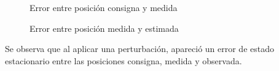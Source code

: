 \documentclass[a4paper, 10pt, onecolumn,journal]{ieeeconf}
\begin{document}
\begin{figure}[H]
	\centering
	\begin{adjustbox}{max width=\columnwidth}
	\end{adjustbox}
	\caption{Error entre  posición consigna y medida}
	\label{Error entre  posición consigna y medida}
\end{figure}

\begin{figure}[H]
	\centering
	\begin{adjustbox}{max width=\columnwidth}
	\end{adjustbox}
	\caption{Error entre  posición medida y estimada}
	\label{Error entre  posición medida y estimada}
\end{figure}
Se observa que al aplicar una perturbación, apareció un error de estado estacionario entre las posiciones consigna, medida y observada.
\end{document}
